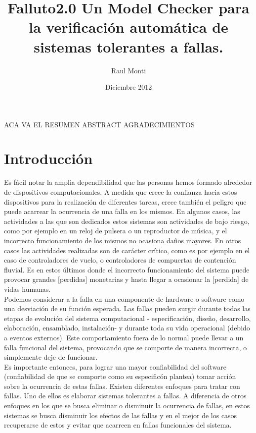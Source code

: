 \documentclass[titlepage, 12pt]{book}
\title{Falluto2.0 Un Model Checker para la verificaci\'on autom\'atica de sistemas tolerantes a fallas.}
\author{Raul Monti}
\date{Diciembre 2012}
\begin{document}
\maketitle

\newpage
ACA VA EL RESUMEN
\newpage
ABSTRACT
\newpage
AGRADECIMIENTOS

\newpage
\tableofcontents

\newpage




\chapter{Introducci\'on}
\label{introduccion}

Es f\'acil notar la amplia dependibilidad que las personas hemos formado alrededor de dispositivos computacionales. A medida que crece la confianza hacia estos dispositivos para la realizaci\'on de diferentes tareas, crece tambi\'en el peligro que puede acarrear la ocurrencia de una falla en los mismos. En algunos casos, las actividades a las que son dedicados estos sistemas son actividades de bajo riesgo, como por ejemplo en un reloj de pulsera o un reproductor de m\'usica, y el incorrecto funcionamiento de los mismos no ocasiona da\~nos mayores. En otros casos las actividades realizadas son de car\'acter cr\'itico, como es por ejemplo en el caso de controladores de vuelo, o controladores de compuertas de contenci\'on fluvial. Es en estos \'ultimos donde el incorrecto funcionamiento del sistema puede provocar grandes [perdidas] monetarias y hasta llegar a ocasionar la [perdida] de vidas humanas.\\

Podemos considerar a la falla en una componente de hardware o software como una desviaci\'on de su funci\'on esperada. Las fallas pueden surgir durante todas las etapas de evoluci\'on del sistema computacional - especificaci\'on, dise\~no, desarrollo, elaboraci\'on, ensamblado, instalaci\'on- y durante toda su vida operacional\cite{faultInjection} (debido a eventos externos). Este comportamiento fuera de lo normal puede llevar a un falla funcional del sistema, provocando que se comporte de manera incorrecta, o simplemente deje de funcionar.\\
Es importante entonces, para lograr una mayor confiabilidad del software (confiabilidad de que se comporte como su especific\'on plantea) tomar acci\'on sobre la ocurrencia de estas fallas. Existen diferentes enfoques para tratar con fallas. Uno de ellos es elaborar sistemas tolerantes a fallas. A diferencia de otros enfoques en los que se busca eliminar o disminuir la ocurrencia de fallas, en estos sistemas se busca disminuir los efectos de las fallas y en el mejor de los casos recuperarse de estos y evitar que acarreen en fallas funcionales del sistema.\\
\end{document}
